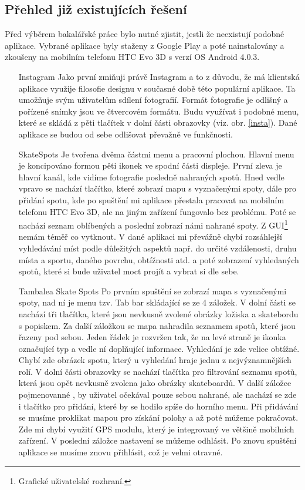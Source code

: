 \documentclass[12pt]{article}
\begin{document}
\subsection{Přehled již existujících řešení}
Před výběrem bakalářské práce bylo nutné zjistit, jestli že
neexistují podobné aplikace. Vybrané aplikace byly staženy z Google Play a poté nainstalovány a zkoušeny na mobilním telefonu HTC Evo 3D s verzí OS Android 4.0.3.
\begin{itemize}
\item[Instagram] Jako první zmiňuji právě Instagram a to z důvodu, že má klientská aplikace využije filosofie designu v současné době této populární aplikace. Ta umožňuje svým uživatelům sdílení fotografií. Formát fotografie je odlišný a pořízené snímky jsou ve čtvercovém formátu. Budu využívat i podobné menu, které se  skládá z pěti tlačítek v dolní části obrazovky (viz. obr. \ref{insta}). Dané aplikace se budou od sebe odlišovat převažně ve funkčnosti.

\item[SkateSpots] Je tvořena dvěma částmi menu a pracovní plochou. Hlavní menu je koncipováno formou pěti ikonek ve spodní části displeje. První zleva je hlavní kanál, kde vidíme fotografie posledně nahraných spotů. Hned vedle vpravo se nachází tlačítko, které zobrazí mapu s vyznačenými spoty, dále pro přidání spotu, kde po spuštění mi aplikace přestala pracovat na mobilním telefonu HTC Evo 3D, ale na jiným zařízení fungovalo bez problému. Poté se nachází seznam oblíbených a poslední zobrazí námi nahrané spoty. Z GUI\footnote[4]{Grafické uživatelské rozhraní.} nemám téměř co vytknout. V dané aplikaci mi převážně chybí rozsáhlejší vyhledávání míst podle důležitých aspektů např. do určité vzdálenosti, druhu místa a sportu, daného povrchu, obtížnosti atd. a poté zobrazení vyhledaných spotů, které si bude uživatel moct projít a vybrat si dle sebe.

\item[Tambalea Skate Spots] Po prvním spuštění se zobrazí mapa s vyznačenými spoty, nad ní je menu tzv. Tab bar skládající se ze 4 záložek. V dolní části se nachází tři tlačítka, které jsou nevkusně zvolené obrázky ložiska a skatebordu s popiskem. Za další záložkou se mapa nahradila seznamem spotů, které jsou řazeny pod sebou. Jeden řádek je rozvržen tak, že na levé straně je ikonka označující typ a vedle ní doplňující informace. Vyhledání je zde velice obtížné. Chybí zde obrázek spotu, který u vyhledání hraje jednu z nejvýznamnějších rolí. V dolní části obrazovky se nachází tlačítka pro filtrování seznamu spotů, která jsou opět nevkusně zvolena jako obrázky skateboardů. V další záložce pojmenovanné , by uživatel očekával pouze sebou nahrané, ale nachází se zde i tlačítko pro přidání, které by se hodilo spíše do horního menu. Při přidávání se musíme proklikat mapou pro získání polohy a až poté můžeme pokračovat. Zde mi chybí využití GPS modulu, který je integrovaný ve většině mobilních zařízení. V poslední záložce nastavení se můžeme odhlásit. Po znovu spuštění aplikace se musíme znovu přihlásit, což je velmi otravné.
\end{itemize}
\end{document}
